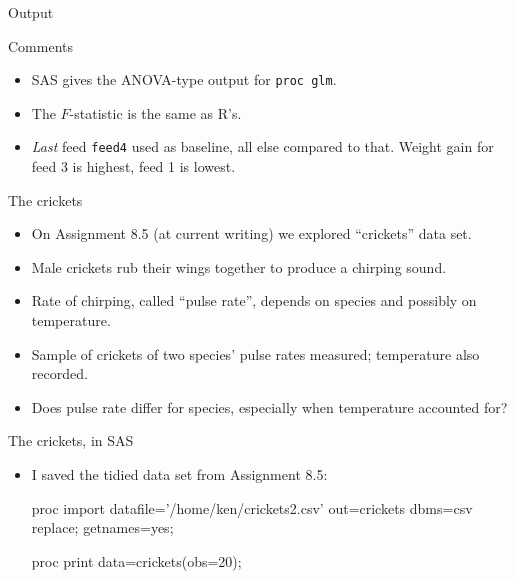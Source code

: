 \documentclass[unknownkeysallowed]{beamer}\usepackage[]{graphicx}\usepackage[]{color}
\begin{document}
\begin{frame}[fragile]{Output}
  
  
\end{frame}

\begin{frame}[fragile]{Comments}
  
  \begin{itemize}
  \item SAS gives the ANOVA-type output for \texttt{proc glm}.
  \item The $F$-statistic is the same as R's.
  \item \emph{Last} feed \texttt{feed4} used as baseline, all else
    compared to that. Weight gain for feed 3 is highest, feed 1 is lowest.
  \end{itemize}
  
\end{frame}

\begin{frame}[fragile]{The crickets}
  
  \begin{itemize}
  \item On Assignment 8.5 (at current writing) we explored ``crickets''
    data set.
  \item Male crickets rub their wings together to produce a chirping
    sound. 
  \item Rate of chirping, called ``pulse rate'', depends on species
    and possibly on temperature.
  \item Sample of crickets of two species' pulse rates measured;
    temperature also recorded.
  \item Does pulse rate differ for species, especially when
    temperature accounted for?
  \end{itemize}
\end{frame}

\begin{frame}[fragile]{The crickets, in SAS}
  
  \begin{itemize}
  \item I saved the tidied data set from Assignment 8.5:
    
    \begin{Sascode}[store=siqet]
proc import
  datafile='/home/ken/crickets2.csv'
  out=crickets
  dbms=csv
  replace;
  getnames=yes;
  
proc print data=crickets(obs=20);
    \end{Sascode}
  \end{itemize}
  
\end{frame}
\end{document}
